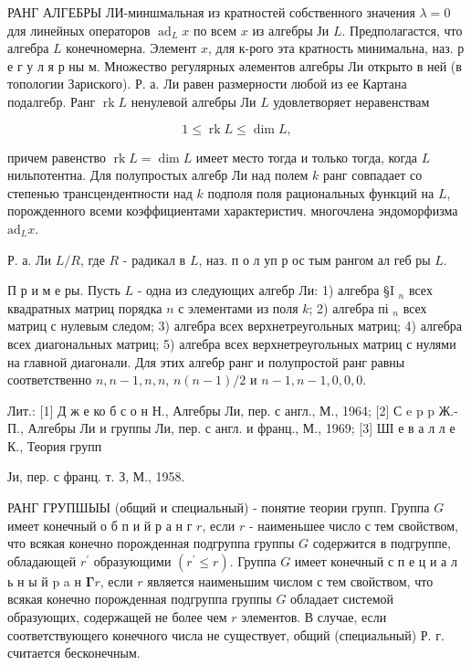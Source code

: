 \documentclass[10pt]{article}
\begin{document}
РАНГ АЛГЕБРЫ ЛИ-миншмальная из кратностей собственного значения $\lambda=0$ для линейных операторов $\operatorname{ad}_{L} x$ по всем $x$ из алгебры Ји $L$. Предполагастся, что алгебра $L$ конечномерна. Элемент $x$, для к-рого эта кратность минимальна, наз. р е г у л я р ны м. Множество регулярных әлементов алгебры Ли открыто в ней (в топологии Зариского). Р. а. Ли равен размерности любой из ее Картана подалгебр. Ранг $\operatorname{rk} L$ ненулевой алгебры Ли $L$ удовлетворяет неравенствам



\[

1 \leqslant \operatorname{rk} L \leqslant \operatorname{dim} L,

\]



причем равенство $\operatorname{rk} L=\operatorname{dim} L$ имеет место тогда и только тогда, когда $L$ нильпотентна. Для полупростых алгебр Ли над полем $k$ ранг совпадает со степенью трансцендентности над $k$ подполя поля рациональных функций на $L$, порожденного всеми коэффициентами характеристич. многочлена эндоморфизма $\mathrm{ad}_{L} x$.



Р. а. Ли $L / R$, где $R$ - радикал в $L$, наз. п о л уп р ос тым рангом ал геб ры $L$.



П р и м е ры. Пусть $L$ - одна из следующих алгебр Ли: 1) алгебра §I $_{n}$ всех квадратных матриц порядка $n$ с элементами из поля $k$; 2) алгебра пі $_{n}$ всех матриц с нулевым следом; 3) алгебра всех верхнетреугольных матриц; 4) алгебра всех диагональных матриц; 5) алгебра всех верхнетреугольных матриц с нулями на главной диагонали. Для этих алгебр ранг и полупростой ранг равны соответственно $n, n-1, n, n$, $n(n-1) / 2$ и $n-1, n-1,0,0,0$.



Лит.: [1] Д ж е ко б с о н Н., Алгебры Ли, пер. с англ., М., 1964; [2] С e p p Ж.-П., Алгебры Ли и группы Ли, пер. с англ. и франц., М., 1969; [3] ШІ е в а л л е К., Теория групп

Ји, пер. с франц. т. З, М., 1958.



РАНГ ГРУПШЫЫ (общий и специальный) - понятие теории групп. Группа $G$ имеет конечный о б п и й р а н г $r$, если $r$ - наименьшее число с тем свойством, что всякая конечно порожденная подгруппа группы $G$ содержится в подгруппе, обладающей $r^{\prime}$ образующими $\left(r^{\prime} \leqslant r\right)$. Группа $G$ имеет конечный с п е ц и а л ь н ы й p a н $\mathbf{\Gamma} r$, если $r$ является наименьшим числом с тем свойством, что всякая конечно порожденная подгруппа группы $G$ обладает системой образующих, содержащей не более чем $r$ элементов. В случае, если соответствующего конечного числа не существует, общий (специальный) Р. г. считается бесконечным.
\end{document}
